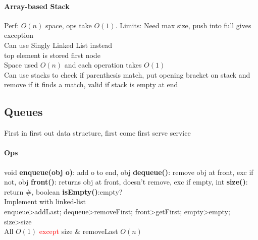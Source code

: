 \paragraph{Array-based Stack}
Perf: $O(n)$ space, ops take $O(1)$. Limits: Need max size, push into full gives exception
\\ Can use Singly Linked List instead
\\ top element is stored first node
\\ Space used $O(n)$ and each operation takes $O(1)$
\\ Can use stacks to check if parenthesis match, put opening bracket on stack and remove if it finds a match, valid if stack is empty at end
\subsection{Queues} First in first out data structure, first come first serve service
\vspace{-7 pt}
\paragraph{Ops} void\textbf{ enqueue(obj o)}: add o to end, obj \textbf{dequeue()}: remove obj at front, exc if not, obj \textbf{front()}: returns obj at front, doesn't remove, exc if empty, int\textbf{ size()}: return \#, boolean \textbf{isEmpty()}:empty?
\\ Implement with linked-list
\\enqueue>addLast; dequeue>removeFirst; front>getFirst; empty>empty; size>size
\\ All $O(1)$ \textcolor{Red}{except} size \& removeLast $O(n)$
\vspace{-7 pt}
